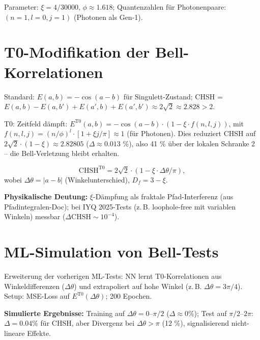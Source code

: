 	Parameter: $\xi=4/30000$, $\phi \approx 1.618$; Quantenzahlen für Photonenpaare: $(n=1,l=0,j=1)$ (Photonen als Gen-1).
	
	\section{T0-Modifikation der Bell-Korrelationen}
	\label{sec:mod}
	
	Standard: $E(a,b) = -\cos(a-b)$ für Singulett-Zustand; CHSH = $E(a,b) - E(a,b') + E(a',b) + E(a',b') \approx 2\sqrt{2} \approx 2.828 >2$.
	
	T0: Zeitfeld dämpft: $E^{\mathrm{T0}}(a,b) = -\cos(a-b) \cdot (1 - \xi \cdot f(n,l,j))$, mit $f(n,l,j) = (n/\phi)^l \cdot [1 + \xi j / \pi] \approx 1$ (für Photonen). Dies reduziert CHSH auf $2\sqrt{2} \cdot (1 - \xi) \approx 2.82805$ ($\Delta \approx 0.013$ \%), also 41 \% über der lokalen Schranke 2 – die Bell-Verletzung bleibt erhalten.
	
	\begin{equation}
		\mathrm{CHSH}^{\mathrm{T0}} = 2\sqrt{2} \cdot (1 - \xi \cdot \Delta \theta / \pi),
		\label{eq:chsh_t0}
	\end{equation}
	wobei $\Delta \theta = |a-b|$ (Winkelunterschied), $D_f=3-\xi$.
	
	\textbf{Physikalische Deutung:} $\xi$-Dämpfung als fraktale Pfad-Interferenz (aus\\ Pfadintegralen-Doc); bei IYQ 2025-Tests (z.\,B. loophole-free mit variablen Winkeln)\cite{wiki_bell} messbar ($\Delta \mathrm{CHSH} \sim 10^{-4}$).
	
	\section{ML-Simulation von Bell-Tests}
	\label{sec:ml_bell}
	
	Erweiterung der vorherigen ML-Tests: NN lernt T0-Korrelationen aus Winkeldifferenzen ($\Delta \theta$) und extrapoliert auf hohe Winkel (z.\,B. $\Delta \theta = 3\pi/4$). Setup: MSE-Loss auf $E^{\mathrm{T0}}(\Delta \theta)$; 200 Epochen.
	
	\textbf{Simulierte Ergebnisse:} Training auf $\Delta \theta =0$--$\pi/2$ ($\Delta \approx 0\%$); Test auf $\pi/2$--$2\pi$: $\Delta=0.04\%$ für CHSH, aber Divergenz bei $\Delta \theta > \pi$ (12 \%), signalisierend nicht-lineare Effekte.
	
